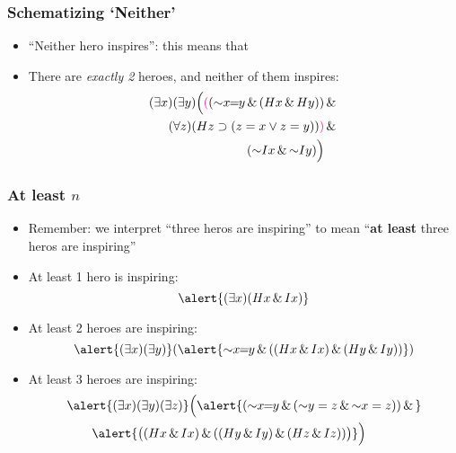 \begin{frame}
    \frametitle{Schematizing `Neither'}

\begin{itemize}[<+->]
\item ``Neither hero inspires'': this means that 
\item[] There are \emph{exactly 2} heroes, and neither of them inspires:
\begin{align*}
\qt{\exists}{x}\qt{\exists}{y}\Big(\textcolor{OGlyallpink}{(}(\lnot x\!\!=\!\!y \land (H\qv{x} \land H\qv{y})) & {}\land {}\\
\qt{\forall}{z}(H\qv{z} \to (z = x \lor z = y))\textcolor{OGlyallpink}{)} &{} \land {}\\
(\enot I\qv{x} \eand \enot I\qv{y})\Big)&
\end{align*}
\end{itemize}
\end{frame}


\begin{frame}
    \frametitle{At least $n$}

\begin{itemize}[<+->]

\item Remember: we interpret ``three heros are inspiring'' to mean ``\textbf{at least} three heros are inspiring''
\item At least 1 hero is inspiring:
\[
\alert{\qt{\exists}{x}(H\qv{x} \land I\qv{x})}
\]
\item At least 2 heroes are inspiring:
\[
\alert{\qt{\exists}{x}\qt{\exists}{y}}(\alert{\enot x\!\!=\!\!y \land ((H\qv{x} \land I\qv{x}) \land (H\qv{y} \land I\qv{y}))})
\]
\item At least 3 heroes are inspiring:
\begin{align*}
& \alert{\qt{\exists}{x}\qt{\exists}{y}\qt{\exists}{z}}\Big(\alert{(\enot x\!\!=\!\!y \land (\enot y = z \land \enot x = z)) \eand {}} \\
& \qquad \alert{\big((H\qv{x} \land I\qv{x}) \land ((H\qv{y} \land I\qv{y}) \eand (H\qv{z} \land I\qv{z}))\big)}\Big)
\end{align*}
\end{itemize}
\end{frame}

